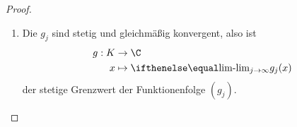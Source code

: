 \begin{st}
\begin{proof}
\begin{enumerate}[1)]
					Sei dazu $ \eps>0 $ beliebig.
					Wähle $ \delta >0 $ passend zu $\eps$ gemäß der gleichgradigen Stetigkeit der Funktionen $g_j$ (ererbt von $f_j$, da Teilfolgen), also:
					\[
						\forall x,x' \in K \forall j \in \N : \|x - x'\| < \delta \implies | g_j(x) - g_j(x') | < \eps.
					\]
					\begin{enumerate}[a)]
						\item
							Wähle $\{\xi_{l_1}, \dotsc, \xi_{l_N} \}\subset M$ so dass $K \subset \bigcup_{m=1}^N K_\delta (\xi_{l_m})$ (funktioniert, da $K$ (üb"-er"-deck"-ungs-)kompakt, siehe Konstruktion von $M$).
						\item
							Da $g_j$ punktweise konvergent (weil Teilfolgen von $f_j$), wähle $J \in \N$, sodass
							\[
								\forall j,k > J \forall m \in \{1, \dotsc, N\} : \big| g_j(\xi_{l_m}) - g_k(\xi_{l_m}) \big| < \eps.
							\]
					\end{enumerate}
					Wir finden jetzt für jedes $ x $ ein $ \xi_{l_i}, i\in\{1,...,N\} $, sodass $ x \in K_\delta(\xi_{l_i}) $.
					Wegen
					\begin{enumerate}[(I)]
						\item $\big|g_j(x)-g_j(\xi_{l_i})\big|< \eps$ da $|x-\xi_{l_i}|<\delta$,
						\item $ \big|g_j(\xi_{l_i}) - g_k(\xi_{l_i})\big| <\eps$ da $j,k > J$,
						\item $ \big| g_k(\xi_{l_i}) - g_k(x)\big| <\eps$ da $|x-\xi_{l_i}| < \delta$
					\end{enumerate}
					gilt
					\begin{align*}
						|g_j(x) - g_k(x)|
						&\le \underbrace{\big|g_j(x)-g_j(\xi_{l_i})\big|}_{\text{(I)}}
							+ \underbrace{\big|g_j(\xi_{l_i}) - g_k(\xi_{l_i})\big|}_{\text{(II)}}
							+ \underbrace{\big| g_k(\xi_{l_i}) - g_k(x)\big|}_{\text{(III)}}. \\
						&< 3\eps
					\end{align*}
					für alle $j,k > J$, $x\in K$.
					Also konvergiert $(g_j)$ gleichmäßig in $K$.
			\item
				Die $g_j$ sind stetig und gleichmäßig konvergent, also ist
				\begin{align*}
					g: K &\to \C \\
					x &\mapsto \lim_{j\to \infty} g_j(x)
				\end{align*}
				der stetige Grenzwert der Funktionenfolge $ (g_j) $.
		\end{enumerate}
	\end{proof}
\end{st}
